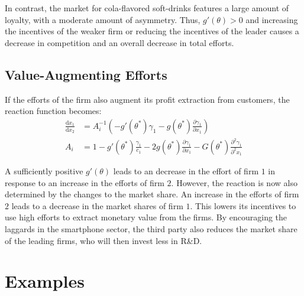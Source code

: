 \documentclass[a4paper, 11pt]{article}
\renewcommand{\d}{\text{d}}
\begin{document}
In contrast, the market for cola-flavored soft-drinks features a large amount of loyalty, with a moderate amount of asymmetry. Thus, $g'(\theta)>0$ and increasing the incentives of the weaker firm or reducing the incentives of the leader causes a decrease in competition and an overall decrease in total efforts.

\subsection{Value-Augmenting Efforts}
If the efforts of the firm also augment its profit extraction from customers, the reaction function becomes:
\begin{align*}
\frac{\d x_1}{\d x_2} &= A_i^{-1} \left(-g'(\theta^*)\gamma_1 - g(\theta^*)\frac{\partial \gamma_1}{\partial x_1}\right)\\
A_i &= 1 - g'(\theta^*)\frac{\gamma_1}{c_1}-2g(\theta^*)\frac{\partial \gamma_1}{\partial x_1}-G(\theta^*)\frac{\partial^2 \gamma_1}{\partial^2 x_1}
\end{align*}

A sufficiently positive $g'(\theta)$ leads to an decrease in the effort of firm $1$ in response to an increase in the efforts of firm $2$. However, the reaction is now also determined by the changes to the market share. An increase in the efforts of firm $2$ leads to a decrease in the market shares of firm $1$. This lowers its incentives to use high efforts to extract monetary value from the firms. By encouraging the laggards in the smartphone sector, the third party also reduces the market share of the leading firms, who will then invest less in R\&D.

\section{Examples}
\end{document}
